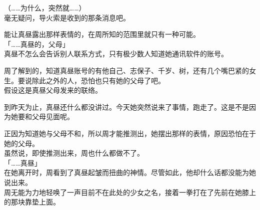 （……为什么，突然就……）\\

毫无疑问，导火索是收到的那条消息吧。

能让真昼露出那样表情的，在周所知的范围里就只有一种可能。\\

「……真昼的，父母」\\

真昼不怎么会告诉别人联系方式，只有极少数人知道她通讯软件的账号。

周了解到的，知道真昼账号的有他自己、志保子、千岁、树，还有几个嘴巴紧的女生。要说除此之外的人，恐怕也只有她的父母了吧。\\

假设这是真昼父母发来的联络。

到昨天为止，真昼还什么都没讲过。今天她突然说来了事情，跑走了。这是不是因为她要和父母见面呢。

正因为知道她与父母不和，所以周才能推测出，她摆出那样的表情，原因恐怕在于她的父母。\\

虽然说，即使推测出来，周也什么都做不了。\\

「……真昼」\\

在她离开时，周看到了真昼起皱而扭曲的神情。尽管如此，他却什么话都没能为她说出来。\\

周无能为力地轻唤了一声目前不在此处的少女之名，接着一拳打在了先前在她膝上的那块靠垫上面。
